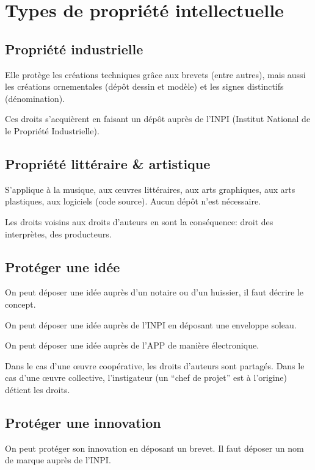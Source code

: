 \documentclass[10pt,a4paper,french]{article}
\begin{document}
\section{Types de propriété intellectuelle}

\subsection{Propriété industrielle}
Elle protège les créations techniques grâce aux brevets (entre autres), mais aussi les créations ornementales (dépôt dessin et modèle) et les signes distinctifs (dénomination).

Ces droits s'acquièrent en faisant un dépôt auprès de l'INPI (Institut National de le Propriété Industrielle).

\subsection{Propriété littéraire \& artistique}
S'applique à la musique, aux œuvres littéraires, aux arts graphiques, aux arts plastiques, aux logiciels (code source). Aucun dépôt n'est nécessaire.

Les droits voisins aux droits d'auteurs en sont la conséquence: droit des interprètes, des producteurs.

\subsection{Protéger une idée}

On peut déposer une idée auprès d'un notaire ou d'un huissier, il faut décrire le concept.

On peut déposer une idée auprès de l'INPI en déposant une enveloppe soleau.

On peut déposer une idée auprès de l'APP de manière électronique.

Dans le cas d'une œuvre coopérative, les droits d'auteurs sont partagés. Dans le cas d'une œuvre collective, l'instigateur (un ``chef de projet'' est à l'origine) détient les droits.

\subsection{Protéger une innovation}

On peut protéger son innovation en déposant un brevet. Il faut déposer un nom de marque auprès de l'INPI.
\end{document}
